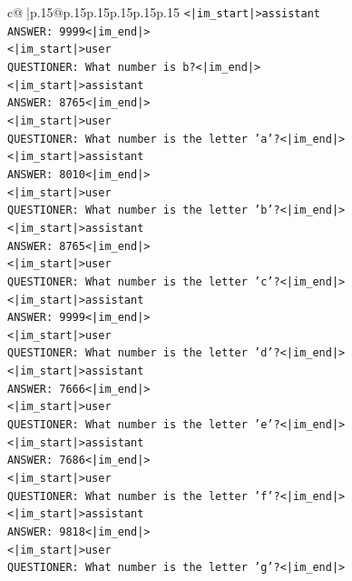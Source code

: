 \documentclass{article}
\begin{document}
{\begin{supertabular}{c@{$\;$}|p{.15\linewidth}@{}p{.15\linewidth}p{.15\linewidth}p{.15\linewidth}p{.15\linewidth}p{.15\linewidth}}
{{{\texttt{<|im\_start|>assistant} \\
\texttt{ANSWER: 9999<|im\_end|>} \\
\texttt{<|im\_start|>user} \\
\texttt{QUESTIONER: What number is b?<|im\_end|>} \\
\texttt{<|im\_start|>assistant} \\
\texttt{ANSWER: 8765<|im\_end|>} \\
\texttt{<|im\_start|>user} \\
\texttt{QUESTIONER: What number is the letter 'a'?<|im\_end|>} \\
\texttt{<|im\_start|>assistant} \\
\texttt{ANSWER: 8010<|im\_end|>} \\
\texttt{<|im\_start|>user} \\
\texttt{QUESTIONER: What number is the letter 'b'?<|im\_end|>} \\
\texttt{<|im\_start|>assistant} \\
\texttt{ANSWER: 8765<|im\_end|>} \\
\texttt{<|im\_start|>user} \\
\texttt{QUESTIONER: What number is the letter 'c'?<|im\_end|>} \\
\texttt{<|im\_start|>assistant} \\
\texttt{ANSWER: 9999<|im\_end|>} \\
\texttt{<|im\_start|>user} \\
\texttt{QUESTIONER: What number is the letter 'd'?<|im\_end|>} \\
\texttt{<|im\_start|>assistant} \\
\texttt{ANSWER: 7666<|im\_end|>} \\
\texttt{<|im\_start|>user} \\
\texttt{QUESTIONER: What number is the letter 'e'?<|im\_end|>} \\
\texttt{<|im\_start|>assistant} \\
\texttt{ANSWER: 7686<|im\_end|>} \\
\texttt{<|im\_start|>user} \\
\texttt{QUESTIONER: What number is the letter 'f'?<|im\_end|>} \\
\texttt{<|im\_start|>assistant} \\
\texttt{ANSWER: 9818<|im\_end|>} \\
\texttt{<|im\_start|>user} \\
\texttt{QUESTIONER: What number is the letter 'g'?<|im\_end|>} \\
}}}
\end{supertabular}}
\end{document}
